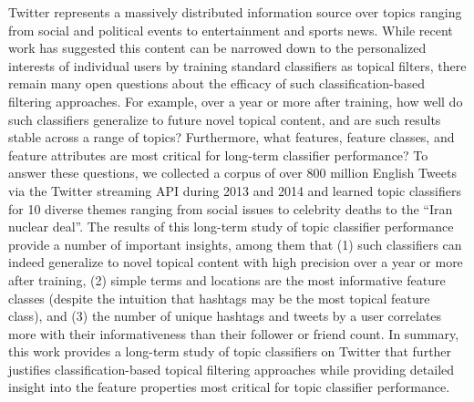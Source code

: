 
Twitter represents a massively distributed information source over topics ranging from social and political events to entertainment and sports news.  While recent work has suggested this content can be narrowed down to the personalized interests of individual users by training standard classifiers as topical filters, there remain many open questions about the efficacy of such classification-based filtering approaches.  For example, over a year or more after training, how well do such classifiers generalize to future novel topical content, and are such results stable across a range of topics?  Furthermore, what features, feature classes, and feature attributes are most critical for long-term classifier performance?  To answer these questions, we collected a corpus of over 800 million English Tweets via the Twitter streaming API during 2013 and 2014 and learned topic classifiers for 10 diverse themes ranging from social issues to celebrity deaths to the ``Iran nuclear deal''.  The results of this long-term study of topic classifier performance provide a number of important insights, among them that (1) such classifiers can indeed generalize to novel topical content with high precision over a year or more after training, (2) simple terms and locations are the most informative feature classes (despite the intuition that hashtags may be the most topical feature class), and (3) the number of unique hashtags and tweets by a user correlates more with their informativeness than their follower or friend count.  In summary, this work provides a long-term study of topic classifiers on Twitter that further justifies classification-based topical filtering approaches while providing detailed insight into the feature properties most critical for topic classifier performance.

%
%
